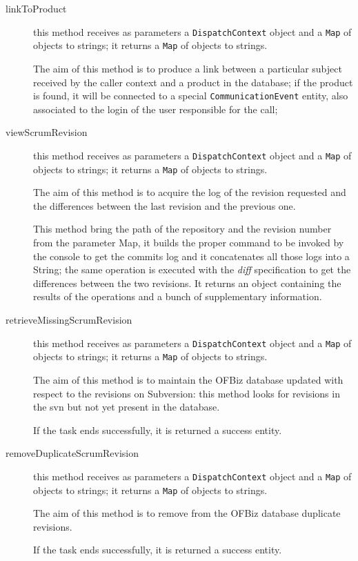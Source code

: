 \documentclass{scrreprt}
\begin{document}
\begin{description}
\item[linkToProduct] this method receives as parameters a \texttt{DispatchContext} object and a \texttt{Map} of objects to strings; it returns a \texttt{Map} of objects to strings.

The aim of this method is to produce a link between a particular subject received by the caller context and a product in the database; if the product is found, it will be connected to a special \texttt{CommunicationEvent} entity, also associated to the login of the user responsible for the call;

\item[viewScrumRevision] this method receives as parameters a \texttt{DispatchContext} object and a \texttt{Map} of objects to strings; it returns a \texttt{Map} of objects to strings.

The aim of this method is to acquire the log of the revision requested and the differences between the last revision and the previous one.

This method bring the path of the repository and the revision number from the parameter Map, it builds the proper command to be invoked by the console to get the commits log and it concatenates all those logs into a String; the same operation is executed with the \emph{diff} specification to get the differences between the two revisions.
It returns an object containing the results of the operations and a bunch of supplementary information.

\item[retrieveMissingScrumRevision] this method receives as parameters a \texttt{DispatchContext} object and a \texttt{Map} of objects to strings; it returns a \texttt{Map} of objects to strings.

The aim of this method is to maintain the OFBiz database updated with respect to the revisions on Subversion: this method looks for revisions in the svn but not yet present in the database.

If the task ends successfully, it is returned a success entity.

\item[removeDuplicateScrumRevision] this method receives as parameters a \texttt{DispatchContext} object and a \texttt{Map} of objects to strings; it returns a \texttt{Map} of objects to strings.

The aim of this method is to remove from the OFBiz database duplicate revisions.

If the task ends successfully, it is returned a success entity.

\end{description}
\end{document}
